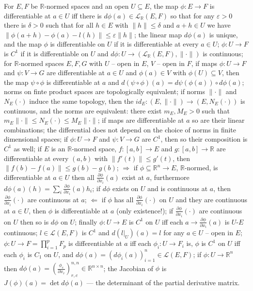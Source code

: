 \documentclass[a4paper]{article}
\newcommand{\Lcal}{\mathcal{L}}
\newcommand{\real}{\mathbb{R}}
\begin{document}
For $E, F$ be $\real$-normed spaces and an open $U\subseteq E$, the map $\phi\colon E\to F$ is differentiable at $a\in U$ iff there is $d\phi(a) \in \Lcal_\real(E, F)$ so that for any $\varepsilon > 0$ there is $\delta > 0$ such that for all $h\in E$ with $\|h\| \leq \delta$ and $a + h \in U$ we have $\|\phi(a+h) - \phi(a) - l(h) \| \leq \varepsilon \|h\|$;
the linear map $d\phi(a)$ is unique, and the map $\phi$ is differentiable on $U$ if it is differentiable at every $a\in U$;
$\phi\colon U \to F$ is $C^1$ if it is differentiable on $U$ and $d\phi\colon U \to (\Lcal_\real(E, F), \|\cdot\|)$ is continuous;
for $\real$-normed spaces $E, F, G$ with $U$ -- open in $E$, $V$ -- open in $F$, if maps $\phi\colon U\to F$ and $\psi\colon V\to G$ are differentiable at $a\in U$ and $\phi(a)\in V$ with $\phi(U) \subseteq V$, then the map $\psi\circ \phi$ is differentiable at $a$ and $d(\psi\circ\phi)(a) = d\psi(\phi(a)) \circ d\phi(a)$;
norms on finte product spaces are topologically equivalent;
if norms $\|\cdot\|$ and $N_E(\cdot)$ induce the same topology, then the $id_E\colon (E, \|\cdot\|) \to (E, N_E(\cdot))$ is continuous, and the norms are equivalent: there exist $m_E, M_E > 0$ such that $m_E\|\cdot\| \leq N_E(\cdot) \leq M_E \|\cdot\|$;
if maps are differentiable at $a$ so are their linear combinations;
the differential does not depend on the choice of norms in finite dimensional spaces;
if $\phi\colon U\to F$ and $\psi\colon V\to G$ are $C^1$, then so their composition is $C^1$ as well;
if $E$ is an $\real$-normed space, $f\colon [a, b] \to E$ and $g\colon [a, b] \to \real$ are differentiable at every $(a, b)$ with $\|f'(t)\| \leq g'(t)$, then $\|f(b) - f(a)\| \leq g(b) - g(b)$;
$\Rightarrow$ if $\phi\subseteq \real^n \to E$, $\real$-normed, is differentiable at $a\in U$ then all $\tfrac{\partial \phi}{\partial x_i}(a)$ exist at $a$, furthermore $d\phi(a)(h) = \sum_i \tfrac{\partial \phi}{\partial x_i}(a) h_i$;
if $d\phi$ exists on $U$ and is continuous at $a$, then $\tfrac{\partial \phi}{\partial x_i}(\cdot)$ are continuous at $a$;
$\Leftarrow$ if $\phi$ has all $\tfrac{\partial \phi}{\partial x_i}(\cdot)$ on $U$ and they are continuous at $a\in U$, then $\phi$ is differentiable at $a$ (only existence!);
if $\tfrac{\partial \phi}{\partial x_i}(\cdot)$ are continuous on $U$ then so is $d\phi$ on $U$;
finally $\phi\colon U\to E$ is $C^1$ on $U$ iff each $a\to \tfrac{\partial \phi}{\partial x_i}(a)$ is $U$-$E$ continuous;
$l\in \Lcal(E, F)$ is $C^1$ and $d(l\big\vert_U)(a) = l$ for any $a\in U$ -- open in $E$;
$\phi\colon U \to F = \prod_{i=1}^p F_p$ is differentiable at $a$ iff each $\phi_i\colon U\to F_i$ is, $\phi$ is $C^1$ on $U$ iff each $\phi_i$ is $C_1$ on $U$, and $d\phi(a) = (d\phi_i(a))_{i=1}^n \in \Lcal(E, F)$;
if $\phi\colon U \to \real^n$ then $d\phi(a) = (\tfrac{\phi_c}{\partial x_r})_{r,c}^{n,n}\in \real^{n\times n}$;
the Jacobian of $\phi$ is $J(\phi)(a) = \det d\phi(a)$ --- the determinant of the partial derivative matrix.
\end{document}
